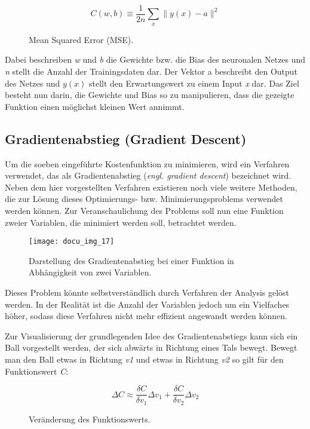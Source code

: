 \begin{figure}[h]
    \centering
    \[ C(w, b) \equiv
          \frac{1}{2n}\displaystyle\sum_{x}{\parallel y(x) - a\parallel^2}
    \]
    \caption{Mean Squared Error (MSE).}
    \label{fig:learn-function}
\end{figure}

Dabei beschreiben \textit{w} und \textit{b} die Gewichte bzw. die Bias des neuronalen Netzes und \textit{n} stellt die Anzahl der Trainingsdaten
dar. Der Vektor a beschreibt den Output des Netzes und \textit{\(y(x)\)} stellt den Erwartungswert zu einem Input \textit{x} dar.
Das Ziel besteht nun darin, die Gewichte und Bias so zu manipulieren, dass die gezeigte Funktion einen möglichst kleinen
Wert annimmt.

\subsection{Gradientenabstieg (Gradient Descent)}

Um die soeben eingeführte Kostenfunktion zu minimieren, wird ein Verfahren verwendet, das als Gradientenabstieg (\textit{engl.
gradient descent}) bezeichnet wird. Neben dem hier vorgestellten Verfahren existieren noch viele weitere Methoden, die
zur Lösung dieses Optimierungs- bzw. Minimierungsproblems verwendet werden können.
Zur Veranschaulichung des Problems soll nun eine Funktion zweier Variablen, die minimiert werden soll, betrachtet werden.

\begin{figure}[h]
    \centering
    \texttt{[image: docu\_img\_17]}
    \caption{Darstellung des Gradientenabstieg bei einer Funktion in Abhängigkeit von zwei Variablen.}
    \label{fig:gradient-decent-3d}
\end{figure}

Dieses Problem könnte selbstverständlich durch Verfahren der Analysis gelöst werden. In der Realität ist die Anzahl der
Variablen jedoch um ein Vielfaches höher, sodass diese Verfahren nicht mehr effizient angewandt werden können.

Zur Visualisierung der grundlegenden Idee des Gradientenabstiegs kann sich ein Ball vorgestellt werden, der sich abwärts
in Richtung eines Tals bewegt. Bewegt man den Ball etwas in Richtung \textit{v1} und etwas in Richtung \textit{v2}
so gilt für den Funktionswert \textit{C}:

\begin{figure}[h]
    \centering
    \[ \Delta C \approx
          \frac{\delta C}{\delta v_1} \Delta v_1 + \frac{\delta C}{\delta v_2} \Delta v_2
    \]
    \caption{Veränderung des Funktionswerts.}
    \label{fig:gradient-decent-definition}
\end{figure}

